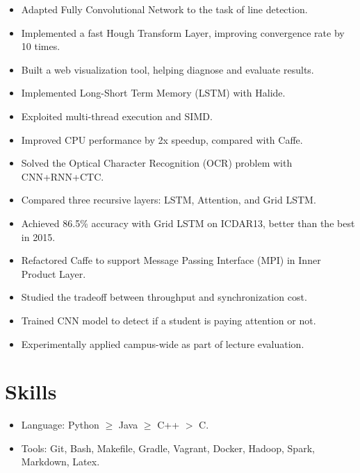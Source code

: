 \documentclass[letterpaper,11pt]{article}
\begin{document}
\begin{itemize}
  \begin{itemize}
  \item Adapted Fully Convolutional Network to the task of line detection.
  \item Implemented a fast Hough Transform Layer, improving convergence rate by 10 times.
  \item Built a web visualization tool, helping diagnose and evaluate results.
  \end{itemize}
  \begin{itemize}
  \item Implemented Long-Short Term Memory (LSTM) with Halide.
  \item Exploited multi-thread execution and SIMD.
  \item Improved CPU performance by 2x speedup, compared with Caffe.  \end{itemize}
  \begin{itemize}
  \item Solved the Optical Character Recognition (OCR) problem with CNN+RNN+CTC.
  \item Compared three recursive layers: LSTM, Attention, and Grid LSTM.
  \item Achieved 86.5\% accuracy with Grid LSTM on ICDAR13, better than the best in 2015.
  \end{itemize}
  \begin{itemize}
  \item Refactored Caffe to support Message Passing Interface (MPI) in Inner Product Layer.
  \item Studied the tradeoff between throughput and synchronization cost.
  \end{itemize}
  \begin{itemize}
  \item Trained CNN model to detect if a student is paying attention or not.
  \item Experimentally applied campus-wide as part of lecture evaluation.
  \end{itemize}
\end{itemize}

\section*{Skills}
\begin{itemize}
\item Language: Python $\ge$ Java $\ge$ C++ $>$ C.
\item Tools: Git, Bash, Makefile, Gradle, Vagrant, Docker, Hadoop, Spark, Markdown, Latex.
\end{itemize}
\end{document}
